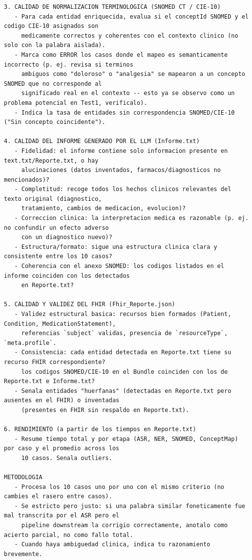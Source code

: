 \begin{lstlisting}
3. CALIDAD DE NORMALIZACION TERMINOLOGICA (SNOMED CT / CIE-10)
   - Para cada entidad enriquecida, evalua si el conceptId SNOMED y el codigo CIE-10 asignados son
     medicamente correctos y coherentes con el contexto clinico (no solo con la palabra aislada).
   - Marca como ERROR los casos donde el mapeo es semanticamente incorrecto (p. ej. revisa si terminos
     ambiguos como "doloroso" o "analgesia" se mapearon a un concepto SNOMED que no corresponde al
     significado real en el contexto -- esto ya se observo como un problema potencial en Test1, verificalo).
   - Indica la tasa de entidades sin correspondencia SNOMED/CIE-10 ("Sin concepto coincidente").

4. CALIDAD DEL INFORME GENERADO POR EL LLM (Informe.txt)
   - Fidelidad: el informe contiene solo informacion presente en text.txt/Reporte.txt, o hay
     alucinaciones (datos inventados, farmacos/diagnosticos no mencionados)?
   - Completitud: recoge todos los hechos clinicos relevantes del texto original (diagnostico,
     tratamiento, cambios de medicacion, evolucion)?
   - Correccion clinica: la interpretacion medica es razonable (p. ej. no confundir un efecto adverso
     con un diagnostico nuevo)?
   - Estructura/formato: sigue una estructura clinica clara y consistente entre los 10 casos?
   - Coherencia con el anexo SNOMED: los codigos listados en el informe coinciden con los detectados
     en Reporte.txt?

5. CALIDAD Y VALIDEZ DEL FHIR (Fhir_Reporte.json)
   - Validez estructural basica: recursos bien formados (Patient, Condition, MedicationStatement),
     referencias `subject` validas, presencia de `resourceType`, `meta.profile`.
   - Consistencia: cada entidad detectada en Reporte.txt tiene su recurso FHIR correspondiente?
     los codigos SNOMED/CIE-10 en el Bundle coinciden con los de Reporte.txt e Informe.txt?
   - Senala entidades "huerfanas" (detectadas en Reporte.txt pero ausentes en el FHIR) o inventadas
     (presentes en FHIR sin respaldo en Reporte.txt).

6. RENDIMIENTO (a partir de los tiempos en Reporte.txt)
   - Resume tiempo total y por etapa (ASR, NER, SNOMED, ConceptMap) por caso y el promedio across los
     10 casos. Senala outliers.

METODOLOGIA
   - Procesa los 10 casos uno por uno con el mismo criterio (no cambies el rasero entre casos).
   - Se estricto pero justo: si una palabra similar foneticamente fue mal transcrita por el ASR pero el
     pipeline downstream la corrigio correctamente, anotalo como acierto parcial, no como fallo total.
   - Cuando haya ambiguedad clinica, indica tu razonamiento brevemente.


\end{lstlisting}
